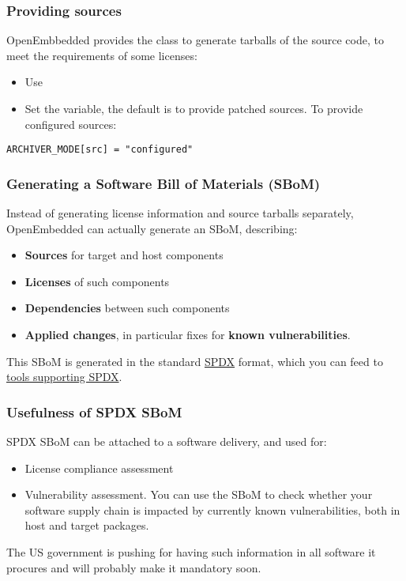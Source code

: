 \begin{frame}[fragile]
  \frametitle{Providing sources}
  OpenEmbbedded provides the  class to generate
  tarballs of the source code, to meet the requirements of some licenses:
  \begin{itemize}
  \item Use 
  \item Set the  variable, the default is to
    provide patched sources. To provide configured sources:
  \end{itemize}
    \begin{block}{}
      \fontsize{9}{9}\selectfont
      \begin{verbatim}
ARCHIVER_MODE[src] = "configured"
      \end{verbatim}
    \end{block}
\end{frame}

\begin{frame}
  \frametitle{Generating a Software Bill of Materials (SBoM)}
  Instead of generating license information and source tarballs separately,
  OpenEmbedded can actually generate an SBoM, describing:
  \begin{itemize}
    \item {\bf Sources} for target and host components
    \item {\bf Licenses} of such components
    \item {\bf Dependencies} between such components
    \item {\bf Applied changes}, in particular fixes for {\bf known vulnerabilities}.
  \end{itemize}
  This SBoM is generated in the standard \href{https://spdx.dev/}{SPDX} format,
  which you can feed to \href{https://spdx.dev/resources/tools/}{tools supporting SPDX}.
\end{frame}

\begin{frame}
  \frametitle{Usefulness of SPDX SBoM}
  SPDX SBoM can be attached to a software delivery, and used for:
  \begin{itemize}
     \item License compliance assessment
     \item Vulnerability assessment. You can use the SBoM to check
	   whether your software supply chain is impacted by currently known
	   vulnerabilities, both in host and target packages.
  \end{itemize}
  The US government is pushing for having such information
  in all software it procures and will probably make it mandatory soon.
\end{frame}

